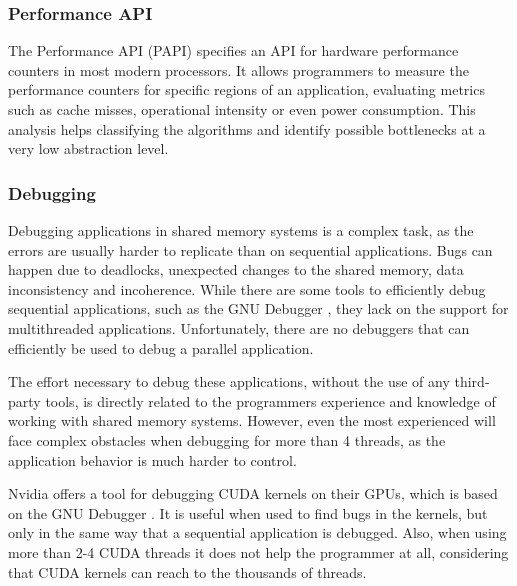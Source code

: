 \subsubsection*{Performance API}
\label{PAPI}

The Performance API (PAPI) \cite{PAPI} specifies an API for hardware performance counters in most modern processors. It allows programmers to measure the performance counters for specific regions of an application, evaluating metrics such as cache misses, operational intensity or even power consumption. This analysis helps classifying the algorithms and identify possible bottlenecks at a very low abstraction level.

\subsubsection*{Debugging}
\label{Debugging}

Debugging applications in shared memory systems is a complex task, as the errors are usually harder to replicate than on sequential applications. Bugs can happen due to deadlocks, unexpected changes to the shared memory, data inconsistency and incoherence. While there are some tools to efficiently debug sequential applications, such as the GNU Debugger \cite{GDB}, they lack on the support for multithreaded applications. Unfortunately, there are no debuggers that can efficiently be used to debug a parallel application.

The effort necessary to debug these applications, without the use of any third-party tools, is directly related to the programmers experience and knowledge of working with shared memory systems. However, even the most experienced will face complex obstacles when debugging for more than 4 threads, as the application behavior is much harder to control.

Nvidia offers a tool for debugging CUDA kernels on their GPUs, which is based on the GNU Debugger \cite{NVIDIA:gdb}. It is useful when used to find bugs in the kernels, but only in the same way that a sequential application is debugged. Also, when using more than 2-4 CUDA threads it does not help the programmer at all, considering that CUDA kernels can reach to the thousands of threads.
